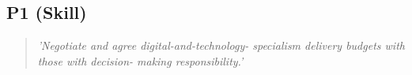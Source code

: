 \subsection*{P1 (Skill)}

  \begin{quote}
    \textit{'Negotiate and agree digital-and-technology-
    specialism delivery budgets with those with decision-
    making responsibility.'}
  \end{quote}

\newpage